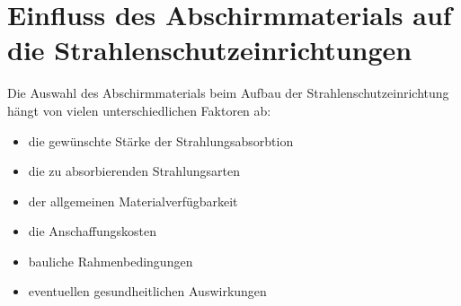 \documentclass[12pt,german]{article}
\begin{document}
    \section{Einfluss des Abschirmmaterials auf die Strahlenschutzeinrichtungen}
    Die Auswahl des Abschirmmaterials beim Aufbau der Strahlenschutzeinrichtung hängt von vielen unterschiedlichen Faktoren ab:
    \begin{itemize}
        \item die gewünschte Stärke der Strahlungsabsorbtion
        \item die zu absorbierenden Strahlungsarten
        \item der allgemeinen Materialverfügbarkeit
        \item die Anschaffungskosten
        \item bauliche Rahmenbedingungen
        \item eventuellen gesundheitlichen Auswirkungen
    \end{itemize}
\end{document}
